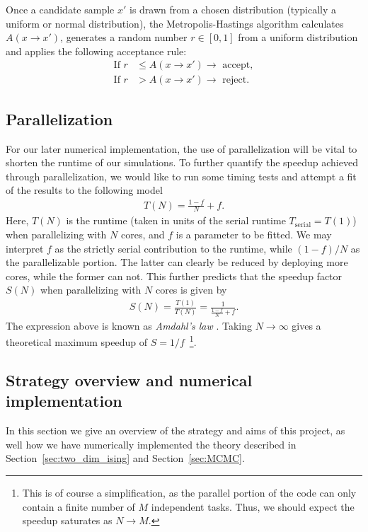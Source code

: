 \documentclass[english,notitlepage,reprint]{revtex4-2}  %
\begin{document}
Once a candidate sample \(x'\) is drawn from a chosen distribution (typically a uniform or normal distribution), the Metropolis-Hastings algorithm calculates \(A(x\rightarrow x')\), generates a random number \(r\in[0,1]\) from a uniform distribution and applies the following acceptance rule:
\begin{align*}
    \text{If } r &\leq A(x\rightarrow x') \rightarrow \text{ accept}, \\
    \text{If } r &> A(x\rightarrow x') \rightarrow \text{ reject}.
\end{align*}

\subsection{Parallelization} \label{sec:parallelization}
For our later numerical implementation, the use of parallelization will be vital to shorten the runtime of our simulations.
To further quantify the speedup achieved through parallelization, we would like to run some timing tests and attempt a fit of the results to the following model
\begin{align}\label{eq:amdahl_T}
   T(N) =  \frac{1-f}{N} + f.
\end{align}
Here, \(T(N)\) is the runtime (taken in units of the serial runtime $T_\mathrm{serial} = T(1)$) when parallelizing with \(N\) cores, and \(f\) is a parameter to be fitted.
We may interpret \(f\) as the strictly serial contribution to the runtime, while \((1-f)/N\) as the parallelizable portion.
The latter can clearly be reduced by deploying more cores, while the former can not.
This further predicts that the speedup factor $S(N)$ when parallelizing with \(N\) cores is given by 
\begin{align}\label{eq:amdahl_S}
    S(N) = \frac{T(1)}{T(N)} = \frac{1}{\frac{1-f}{N} + f}.
\end{align}
The expression above is known as \emph{Amdahl's law} \cite{amdahl1967validity}.
Taking \(N\rightarrow \infty\) gives a theoretical maximum speedup of \(S = 1/f\)~\footnote{This is of course a simplification, as the parallel portion of the code can only contain a finite number of $M$ independent tasks. Thus, we should expect the speedup saturates as \(N\rightarrow M\).}.


\subsection{Strategy overview and numerical implementation} \label{sec:numerical_implementation}
In this section we give an overview of the strategy and aims of this project, as well how we have numerically implemented the theory described in Section~\ref{sec:two_dim_ising} and Section~\ref{sec:MCMC}. 
\end{document}
